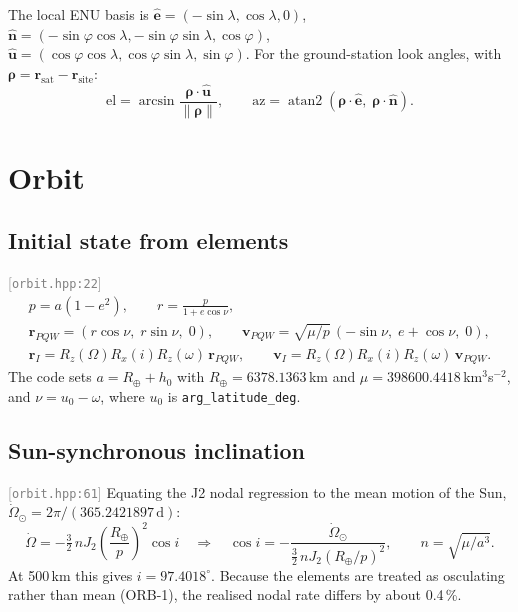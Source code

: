 \documentclass[11pt,a4paper]{article}
\newcommand{\vb}[1]{\boldsymbol{#1}}
\newcommand{\uv}[1]{\hat{\boldsymbol{#1}}}
\newcommand{\code}[1]{\texttt{#1}}
\newcommand{\src}[1]{\textcolor{gray}{\small[\texttt{#1}]}}
\begin{document}
The local ENU basis is
$\uv e = (-\sin\lambda, \cos\lambda, 0)$,
$\uv n = (-\sin\varphi\cos\lambda, -\sin\varphi\sin\lambda, \cos\varphi)$,
$\uv u = (\cos\varphi\cos\lambda, \cos\varphi\sin\lambda, \sin\varphi)$.
For the ground-station look angles, with $\vb\rho = \vb r_{\text{sat}} - \vb r_{\text{site}}$:
\begin{equation}
\text{el} = \arcsin\frac{\vb\rho\cdot\uv u}{\lVert\vb\rho\rVert},\qquad
\text{az} = \operatorname{atan2}(\vb\rho\cdot\uv e,\; \vb\rho\cdot\uv n).
\end{equation}

\section{Orbit}

\subsection{Initial state from elements} \src{orbit.hpp:22}
\begin{gather}
p = a(1-e^2),\qquad r = \frac{p}{1+e\cos\nu},\\
\vb r_{PQW} = (r\cos\nu,\; r\sin\nu,\; 0),\qquad
\vb v_{PQW} = \sqrt{\mu/p}\,(-\sin\nu,\; e+\cos\nu,\; 0),\\
\vb r_I = R_z(\Omega)R_x(i)R_z(\omega)\,\vb r_{PQW},\qquad \vb v_I = R_z(\Omega)R_x(i)R_z(\omega)\,\vb v_{PQW}.
\end{gather}
The code sets $a = R_\oplus + h_0$ with $R_\oplus = 6378.1363$\,km and $\mu = 398600.4418$\,km$^3$s$^{-2}$, and $\nu = u_0 - \omega$, where $u_0$ is \code{arg\_latitude\_deg}.

\subsection{Sun-synchronous inclination} \src{orbit.hpp:61}
Equating the J2 nodal regression to the mean motion of the Sun, $\dot\Omega_\odot = 2\pi/(365.2421897\,\mathrm{d})$:
\begin{equation}
\dot\Omega = -\tfrac32\, n J_2 \left(\frac{R_\oplus}{p}\right)^{2}\cos i
\quad\Rightarrow\quad
\cos i = -\frac{\dot\Omega_\odot}{\tfrac32\, n J_2 (R_\oplus/p)^2},\qquad n = \sqrt{\mu/a^3}.
\end{equation}
At 500\,km this gives $i = 97.4018^\circ$. Because the elements are treated as osculating rather than mean (ORB-1), the realised nodal rate differs by about 0.4\,\%.
\end{document}
